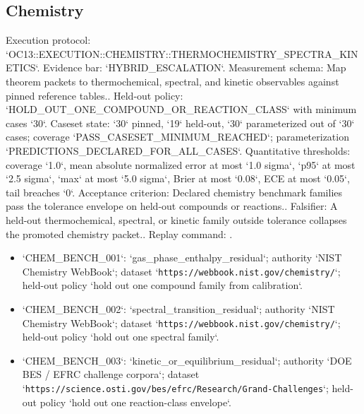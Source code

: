 \subsection{Chemistry}
Execution protocol: `OC13::EXECUTION::CHEMISTRY::THERMOCHEMISTRY\_SPECTRA\_KINETICS`. Evidence bar: `HYBRID\_ESCALATION`.
Measurement schema: Map theorem packets to thermochemical, spectral, and kinetic observables against pinned reference tables..
Held-out policy: `HOLD\_OUT\_ONE\_COMPOUND\_OR\_REACTION\_CLASS` with minimum cases `30`.
Caseset state: `30` pinned, `19` held-out, `30` parameterized out of `30` cases; coverage `PASS\_CASESET\_MINIMUM\_REACHED`; parameterization `PREDICTIONS\_DECLARED\_FOR\_ALL\_CASES`.
Quantitative thresholds: coverage `1.0`, mean absolute normalized error at most `1.0 sigma`, `p95` at most `2.5 sigma`, `max` at most `5.0 sigma`, Brier at most `0.08`, ECE at most `0.05`, tail breaches `0`.
Acceptance criterion: Declared chemistry benchmark families pass the tolerance envelope on held-out compounds or reactions..
Falsifier: A held-out thermochemical, spectral, or kinetic family outside tolerance collapses the promoted chemistry packet..
Replay command: .
\begin{itemize}
\item `CHEM\_BENCH\_001`: `gas\_phase\_enthalpy\_residual`; authority `NIST Chemistry WebBook`; dataset `\texttt{https://webbook.nist.gov/chemistry/}`; held-out policy `hold out one compound family from calibration`.
\item `CHEM\_BENCH\_002`: `spectral\_transition\_residual`; authority `NIST Chemistry WebBook`; dataset `\texttt{https://webbook.nist.gov/chemistry/}`; held-out policy `hold out one spectral family`.
\item `CHEM\_BENCH\_003`: `kinetic\_or\_equilibrium\_residual`; authority `DOE BES / EFRC challenge corpora`; dataset `\texttt{https://science.osti.gov/bes/efrc/Research/Grand-Challenges}`; held-out policy `hold out one reaction-class envelope`.
\end{itemize}


